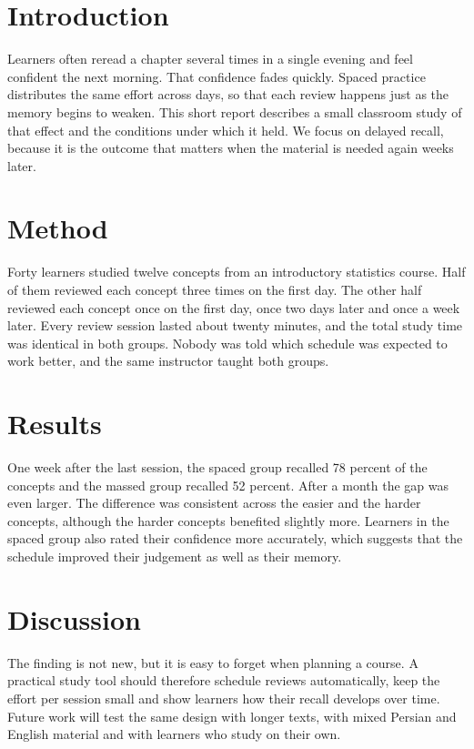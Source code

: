 \documentclass[11pt,twocolumn]{article}
\begin{document}
\section*{Introduction}
Learners often reread a chapter several times in a single evening and feel confident the next morning. That confidence fades quickly. Spaced practice distributes the same effort across days, so that each review happens just as the memory begins to weaken. This short report describes a small classroom study of that effect and the conditions under which it held. We focus on delayed recall, because it is the outcome that matters when the material is needed again weeks later.

\section*{Method}
Forty learners studied twelve concepts from an introductory statistics course. Half of them reviewed each concept three times on the first day. The other half reviewed each concept once on the first day, once two days later and once a week later. Every review session lasted about twenty minutes, and the total study time was identical in both groups. Nobody was told which schedule was expected to work better, and the same instructor taught both groups.

\section*{Results}
One week after the last session, the spaced group recalled 78 percent of the concepts and the massed group recalled 52 percent. After a month the gap was even larger. The difference was consistent across the easier and the harder concepts, although the harder concepts benefited slightly more. Learners in the spaced group also rated their confidence more accurately, which suggests that the schedule improved their judgement as well as their memory.

\section*{Discussion}
The finding is not new, but it is easy to forget when planning a course. A practical study tool should therefore schedule reviews automatically, keep the effort per session small and show learners how their recall develops over time. Future work will test the same design with longer texts, with mixed Persian and English material and with learners who study on their own.
\end{document}
